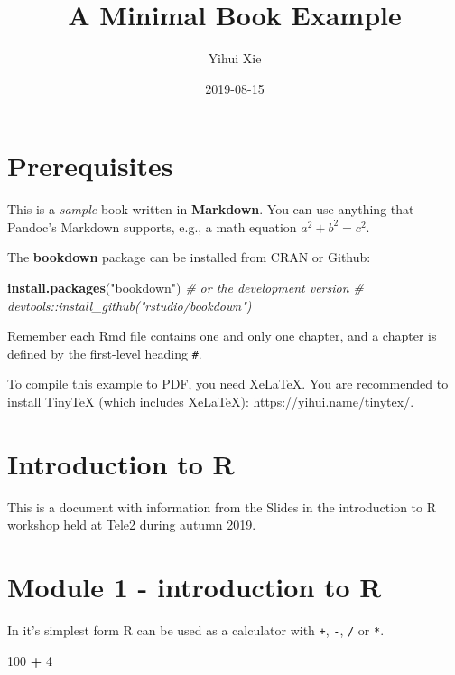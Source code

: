 \documentclass[]{book}
\title{A Minimal Book Example}
\author{Yihui Xie}
\date{2019-08-15}
\newenvironment{Shaded}{\begin{snugshade}}{\end{snugshade}}
\newcommand{\CommentTok}[1]{\textcolor[rgb]{0.56,0.35,0.01}{\textit{#1}}}
\newcommand{\DecValTok}[1]{\textcolor[rgb]{0.00,0.00,0.81}{#1}}
\newcommand{\KeywordTok}[1]{\textcolor[rgb]{0.13,0.29,0.53}{\textbf{#1}}}
\newcommand{\NormalTok}[1]{#1}
\newcommand{\OperatorTok}[1]{\textcolor[rgb]{0.81,0.36,0.00}{\textbf{#1}}}
\newcommand{\StringTok}[1]{\textcolor[rgb]{0.31,0.60,0.02}{#1}}
\begin{document}
\maketitle

{
\setcounter{tocdepth}{1}
\tableofcontents
}
\hypertarget{prerequisites}{%
\chapter{Prerequisites}\label{prerequisites}}

This is a \emph{sample} book written in \textbf{Markdown}. You can use anything that Pandoc's Markdown supports, e.g., a math equation \(a^2 + b^2 = c^2\).

The \textbf{bookdown} package can be installed from CRAN or Github:

\begin{Shaded}
\begin{Highlighting}[]
\KeywordTok{install.packages}\NormalTok{(}\StringTok{"bookdown"}\NormalTok{)}
\CommentTok{# or the development version}
\CommentTok{# devtools::install_github("rstudio/bookdown")}
\end{Highlighting}
\end{Shaded}

Remember each Rmd file contains one and only one chapter, and a chapter is defined by the first-level heading \texttt{\#}.

To compile this example to PDF, you need XeLaTeX. You are recommended to install TinyTeX (which includes XeLaTeX): \url{https://yihui.name/tinytex/}.

\hypertarget{introduction-to-r}{%
\chapter{Introduction to R}\label{introduction-to-r}}

This is a document with information from the Slides in the introduction to R workshop held at Tele2 during autumn 2019.

\hypertarget{module-1---introduction-to-r}{%
\chapter{Module 1 - introduction to R}\label{module-1---introduction-to-r}}

In it's simplest form R can be used as a calculator with \texttt{+}, \texttt{-}, \texttt{/} or \texttt{*}.

\begin{Shaded}
\begin{Highlighting}[]
\DecValTok{100} \OperatorTok{+}\StringTok{ }\DecValTok{4}
\end{Highlighting}
\end{Shaded}
\end{document}
